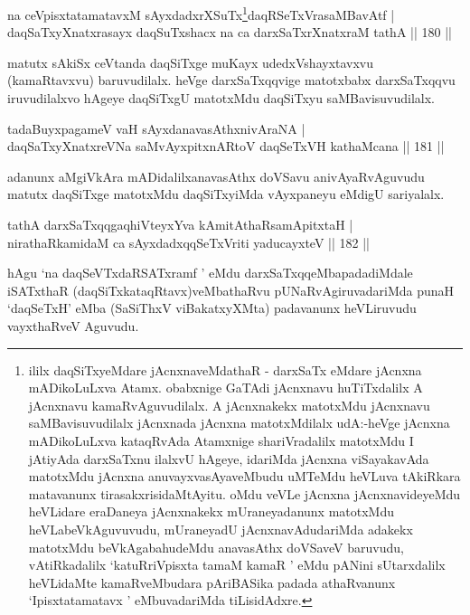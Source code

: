 \begin{shl}
na ceVpisxtatamatavxM sAyxdadxrXSuTx\footnote{ililx daqSiTxyeMdare jAcnxnaveMdathaR - darxSaTx eMdare jAcnxna mADikoLuLxva Atamx. obabxnige GaTAdi jAcnxnavu huTiTxdalilx A jAcnxnavu kamaRvAguvudilalx. A jAcnxnakekx matotxMdu jAcnxnavu saMBavisuvudilalx jAcnxnada jAcnxna matotxMdilalx udA:-heVge jAcnxna mADikoLuLxva kataqRvAda Atamxnige shariVradalilx matotxMdu I jAtiyAda darxSaTxnu ilalxvU hAgeye, idariMda jAcnxna viSayakavAda matotxMdu jAcnxna anuvayxvasAyaveMbudu uMTeMdu heVLuva tAkiRkara matavanunx tirasakxrisidaMtAyitu. oMdu veVLe jAcnxna jAcnxnavideyeMdu heVLidare eraDaneya jAcnxnakekx mUraneyadanunx matotxMdu heVLabeVkAguvuvudu, mUraneyadU jAcnxnavAdudariMda adakekx matotxMdu beVkAgabahudeMdu anavasAthx doVSaveV baruvudu, vAtiRkadalilx `katuRriVpisxta tamaM kamaR ' eMdu pANini sUtarxdalilx heVLidaMte kamaR\-\break veMbudara pAriBASika padada athaRvanunx `Ipisxtatamatavx ' eMbuvadariMda tiLisidAdxre.}daqRSeTxVrasaMBavAtf |\\
daqSaTxyXnatxrasayx daqSuTxshacx na ca darxSaTxrXnatxraM tathA \hfill || 180 ||
\end{shl}

\begin{artha}
matutx sAkiSx ceVtanda daqSiTxge muKayx udedxVshayxtavxvu (kamaRtavxvu) baruvudilalx. heVge darxSaTxqqvige matotxbabx darxSaTxqqvu iruvudilalxvo hAgeye daqSiTxgU matotxMdu daqSiTxyu saMBavisuvudilalx.
\end{artha}

\begin{shl}
tadaBuyxpagameV vaH sAyxdanavasAthx\s nivAraNA |\\
daqSaTxyXnatxreVNa saMvAyxpitxnARtoV daqSeTxVH kathaMcana \hfill || 181 ||
\end{shl}

\begin{artha}
adanunx aMgiVkAra mADidalilx\footnotemark[2] anavasAthx doVSavu anivAyaRvAguvudu matutx daqSiTxge matotxMdu daqSiTxyiMda vAyxpaneyu eMdigU sariyalalx.
\end{artha}

\begin{shl}
tathA darxSaTxqqgaqhiVteyxYva kAmitAthaRsamApitxtaH |\\
nirathaRkamidaM ca sAyxdadxqqSeTxVriti yaducayxteV \hfill || 182 ||
\end{shl}

\begin{artha}%
hAgu `na daqSeVTxdaRSATxramf ' eMdu darxSaTxqqeMbapadadiMdale iSATxthaR (daqSiTxkataqRtavx)veMbathaRvu pUNaRvAgiruvadariMda punaH `daqSeTxH' eMba (SaSiThxV viBakatxyXMta) padavanunx heVLiruvudu vayxthaRveV Aguvudu.
\end{artha}

